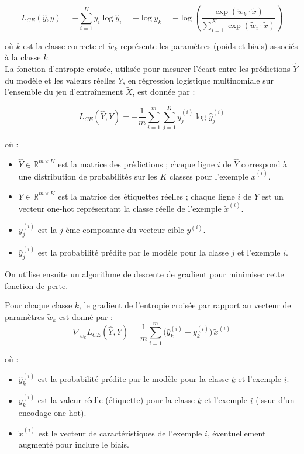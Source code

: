 \documentclass[12pt,a4paper]{report}
\begin{document}
\[
L_{CE}(\hat{y}, y)
= - \sum_{i=1}^{K} y_i \log \hat{y}_i
= - \log \hat{y}_k
= - \log \left(
\frac{\exp(\tilde{w}_k \cdot \tilde{x})}
{\sum_{i=1}^{K} \exp(\tilde{w}_i \cdot \tilde{x})}
\right)
\]

où $k$ est la classe correcte et $\tilde{w}_k$ représente les paramètres (poids et biais) associés à la classe $k$.\\

La fonction d’entropie croisée, utilisée pour mesurer l’écart entre les prédictions $\hat{Y}$ du modèle et les valeurs réelles $Y$, en régression logistique multinomiale sur l’ensemble du jeu d’entraînement $\tilde{X}$, est donnée par :

\[
L_{CE}(\hat{Y}, Y)
= - \frac{1}{m} \sum_{i=1}^{m} \sum_{j=1}^{K} y_j^{(i)} \log \hat{y}_j^{(i)}
\]

où :
\begin{itemize}
	\item $\hat{Y} \in \mathbb{R}^{m \times K}$ est la matrice des prédictions ; chaque ligne $i$ de $\hat{Y}$ correspond à une distribution de probabilités sur les $K$ classes pour l’exemple $\tilde{x}^{(i)}$.
	\item $Y \in \mathbb{R}^{m \times K}$ est la matrice des étiquettes réelles ; chaque ligne $i$ de $Y$ est un vecteur one-hot représentant la classe réelle de l’exemple $\tilde{x}^{(i)}$.
	\item $y_j^{(i)}$ est la $j$-ème composante du vecteur cible $y^{(i)}$.
	\item $\hat{y}_j^{(i)}$ est la probabilité prédite par le modèle pour la classe $j$ et l’exemple $i$.
\end{itemize}
On utilise ensuite un algorithme de descente de gradient pour minimiser cette fonction de perte.

Pour chaque classe $k$, le gradient de l’entropie croisée par rapport au vecteur de paramètres $\tilde{w}_k$ est donné par :
\[
\nabla_{\tilde{w}_k} L_{CE}(\hat{Y}, Y)
= \frac{1}{m} \sum_{i=1}^{m} \big(\hat{y}_k^{(i)} - y_k^{(i)}\big)\, \tilde{x}^{(i)}
\]

où :
\begin{itemize}
	\item $\hat{y}_k^{(i)}$ est la probabilité prédite par le modèle pour la classe $k$ et l’exemple $i$.
	\item $y_k^{(i)}$ est la valeur réelle (étiquette) pour la classe $k$ et l’exemple $i$ (issue d’un encodage one-hot).
	\item $\tilde{x}^{(i)}$ est le vecteur de caractéristiques de l’exemple $i$, éventuellement augmenté pour inclure le biais.
\end{itemize}
\end{document}
